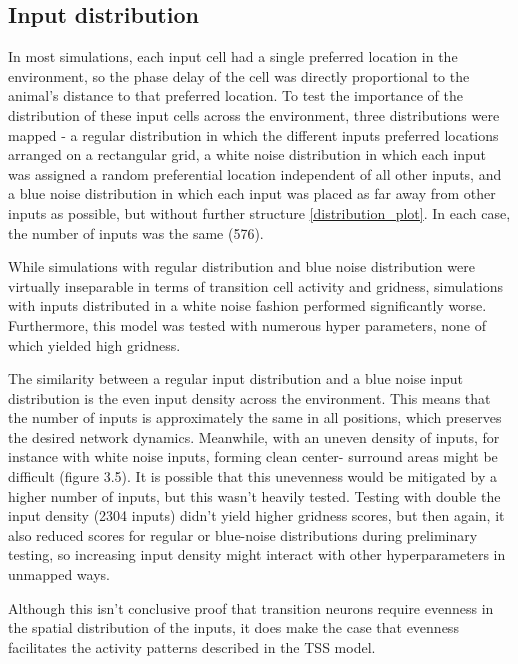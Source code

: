 \documentclass{article}
\begin{document}
    \subsection{Input distribution}
    In most simulations, each input cell had a single preferred location in the environment, so the phase delay of the cell was directly proportional to the animal's distance to that preferred location. To test the importance of the distribution of these input cells across the environment, three distributions were mapped - a regular distribution in which the different inputs preferred locations arranged on a rectangular grid, a white noise distribution in which each input was assigned a random preferential location independent of all other inputs, and a blue noise distribution in which each input was placed as far away from other inputs as possible, but without further structure \ref{distribution_plot}. In each case, the number of inputs was the same (576).

    While simulations with regular distribution and blue noise distribution were virtually inseparable in terms of transition cell activity and gridness, simulations with inputs distributed in a white noise fashion performed significantly worse. Furthermore, this model was tested with numerous hyper parameters, none of which yielded high gridness.

    The similarity between a regular input distribution and a blue noise input distribution is the even input density across the environment. This means that the number of inputs is approximately the same in all positions, which preserves the desired network dynamics. Meanwhile, with an uneven density of inputs, for instance with white noise inputs, forming clean center- surround areas might be difficult (figure 3.5). It is possible that this unevenness would be mitigated by a higher number of inputs, but this wasn't heavily tested. Testing with double the input density (2304 inputs) didn't yield higher gridness scores, but then again, it also reduced scores for regular or blue-noise distributions during preliminary testing, so increasing input density might interact with other hyperparameters in unmapped ways.

    Although this isn't conclusive proof that transition neurons require evenness in the spatial distribution of the inputs, it does make the case that evenness facilitates the activity patterns described in the TSS model.
\end{document}

